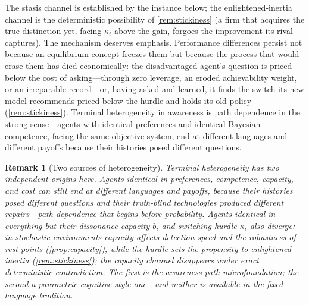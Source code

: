 \documentclass[11pt]{article}
\newtheorem{remark}[assumption]{Remark}
\theoremstyle{definition}
\begin{document}
The stasis channel is established by the instance below; the enlightened-inertia channel is the deterministic possibility of \cref{rem:stickiness} (a firm that acquires the true distinction yet, facing $\kappa_i$ above the gain, forgoes the improvement its rival captures). The mechanism deserves emphasis.
Performance differences persist not because an equilibrium concept freezes them but because the process that would erase them has died economically: the disadvantaged agent's question is priced below the cost of asking---through zero leverage, an eroded achievability weight, or an irreparable record---or, having asked and learned, it finds the switch its new model recommends priced below the hurdle and holds its old policy (\cref{rem:stickiness}).
Terminal heterogeneity in awareness is path dependence in the strong sense---agents with identical preferences and identical Bayesian competence, facing the same objective system, end at different languages and different payoffs because their histories posed different questions.

\begin{remark}[Two sources of heterogeneity]
\label{rem:two-sources}
Terminal heterogeneity has two independent origins here.
Agents identical in preferences, competence, capacity, and cost can still end at different languages and payoffs, because their histories posed different questions and their truth-blind technologies produced different repairs---path dependence that begins before probability.
Agents identical in \emph{everything} but their dissonance capacity $b_i$ and switching hurdle $\kappa_i$ also diverge: in stochastic environments capacity affects detection speed and the robustness of rest points (\cref{prop:capacity}), while the hurdle sets the propensity to enlightened inertia (\cref{rem:stickiness}); the capacity channel disappears under exact deterministic contradiction.
The first is the awareness-path microfoundation; the second a parametric cognitive-style one---and neither is available in the fixed-language tradition.
\end{remark}
\end{document}
